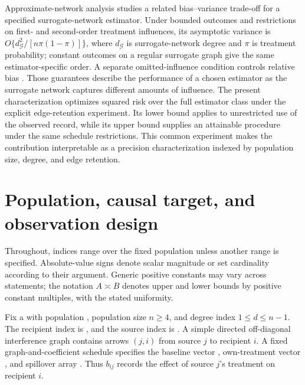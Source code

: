 \documentclass[11pt]{article}
\begin{document}
Approximate-network analysis studies a related bias--variance trade-off for a specified surrogate-network estimator. Under bounded outcomes and restrictions on first- and second-order treatment influences, its asymptotic variance is \(O\{d_{\mathcal G}^2/[n\pi(1-\pi)]\}\), where \(d_{\mathcal G}\) is surrogate-network degree and \(\pi\) is treatment probability; constant outcomes on a regular surrogate graph give the same estimator-specific order. A separate omitted-influence condition controls relative bias \citep[Assumptions 1--3; Theorems 1--2; Lemma 2]{JiangDengWangWang2024ApproximateNetworks}. Those guarantees describe the performance of a chosen estimator as the surrogate network captures different amounts of influence. The present characterization optimizes squared risk over the full estimator class under the explicit edge-retention experiment. Its lower bound applies to unrestricted use of the observed record, while its upper bound supplies an attainable procedure under the same schedule restrictions. This common experiment makes the contribution interpretable as a precision characterization indexed by population size, degree, and edge retention.


\section{Population, causal target, and observation design}

Throughout, indices range over the fixed population unless another range is specified. Absolute-value signs denote scalar magnitude or set cardinality according to their argument. Generic positive constants may vary across statements; the notation \(A\asymp B\) denotes upper and lower bounds by positive constant multiples, with the stated uniformity.

Fix a  with population , population size \(n\ge4\), and degree index \(1\le d\le n-1\). The recipient index is , and the source index is . A simple directed off-diagonal interference graph  contains arrows \((j,i)\) from source \(j\) to recipient \(i\). A fixed graph-and-coefficient schedule  specifies the baseline vector , own-treatment vector , and spillover array . Thus \(b_{ij}\) records the effect of source \(j\)'s treatment on recipient \(i\).
\end{document}
